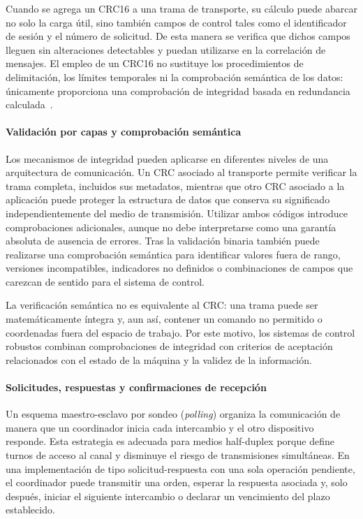 Cuando se agrega un CRC16 a una trama de transporte, su cálculo puede abarcar no solo la carga útil, sino también campos de control tales como el identificador de sesión y el número de solicitud. De esta manera se verifica que dichos campos lleguen sin alteraciones detectables y puedan utilizarse en la correlación de mensajes. El empleo de un CRC16 no sustituye los procedimientos de delimitación, los límites temporales ni la comprobación semántica de los datos: únicamente proporciona una comprobación de integridad basada en redundancia calculada~\cite{williams1993crc}.

\paragraph{Validación por capas y comprobación semántica}
Los mecanismos de integridad pueden aplicarse en diferentes niveles de una arquitectura de comunicación. Un CRC asociado al transporte permite verificar la trama completa, incluidos sus metadatos, mientras que otro CRC asociado a la aplicación puede proteger la estructura de datos que conserva su significado independientemente del medio de transmisión. Utilizar ambos códigos introduce comprobaciones adicionales, aunque no debe interpretarse como una garantía absoluta de ausencia de errores. Tras la validación binaria también puede realizarse una comprobación semántica para identificar valores fuera de rango, versiones incompatibles, indicadores no definidos o combinaciones de campos que carezcan de sentido para el sistema de control.

La verificación semántica no es equivalente al CRC: una trama puede ser matemáticamente íntegra y, aun así, contener un comando no permitido o coordenadas fuera del espacio de trabajo. Por este motivo, los sistemas de control robustos combinan comprobaciones de integridad con criterios de aceptación relacionados con el estado de la máquina y la validez de la información.

\paragraph{Solicitudes, respuestas y confirmaciones de recepción}
Un esquema maestro-esclavo por sondeo (\textit{polling}) organiza la comunicación de manera que un coordinador inicia cada intercambio y el otro dispositivo responde. Esta estrategia es adecuada para medios half-duplex porque define turnos de acceso al canal y disminuye el riesgo de transmisiones simultáneas. En una implementación de tipo solicitud-respuesta con una sola operación pendiente, el coordinador puede transmitir una orden, esperar la respuesta asociada y, solo después, iniciar el siguiente intercambio o declarar un vencimiento del plazo establecido.

